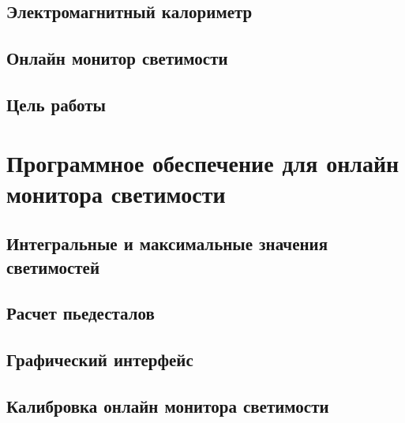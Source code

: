 \documentclass[a4paper, 12pt]{article}
\begin{document}
    \subsection{Электромагнитный калориметр}
    
    \subsection{Онлайн монитор светимости}
    
    \subsection{Цель работы}
    

\section{Программное обеспечение для онлайн монитора светимости}
    \subsection{Интегральные и максимальные значения светимостей}
    
    \subsection{Расчет пьедесталов}
    
    \subsection{Графический интерфейс}
    
    \subsection{Калибровка онлайн монитора светимости}
    
\end{document}
